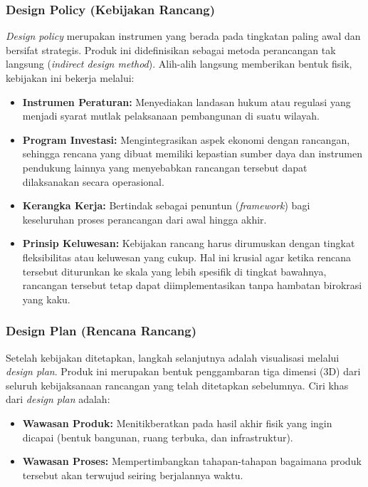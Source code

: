 \documentclass[../rumukota.tex]{subfiles}
\begin{document}
\subsubsection{Design Policy (Kebijakan Rancang)}
\textit{Design policy} merupakan instrumen yang berada pada tingkatan paling awal dan bersifat strategis. Produk ini didefinisikan sebagai metoda perancangan tak langsung (\textit{indirect design method}). Alih-alih langsung memberikan bentuk fisik, kebijakan ini bekerja melalui:
\begin{itemize}
	\item \textbf{Instrumen Peraturan:} Menyediakan landasan hukum atau regulasi yang menjadi syarat mutlak pelaksanaan pembangunan di suatu wilayah.
	\item \textbf{Program Investasi:} Mengintegrasikan aspek ekonomi dengan rancangan, sehingga rencana yang dibuat memiliki kepastian sumber daya dan instrumen pendukung lainnya yang menyebabkan rancangan tersebut dapat dilaksanakan secara operasional.
	\item \textbf{Kerangka Kerja:} Bertindak sebagai penuntun (\textit{framework}) bagi keseluruhan proses perancangan dari awal hingga akhir.
	\item \textbf{Prinsip Keluwesan:} Kebijakan rancang harus dirumuskan dengan tingkat fleksibilitas atau keluwesan yang cukup. Hal ini krusial agar ketika rencana tersebut diturunkan ke skala yang lebih spesifik di tingkat bawahnya, rancangan tersebut tetap dapat diimplementasikan tanpa hambatan birokrasi yang kaku.
\end{itemize}

\subsubsection{Design Plan (Rencana Rancang)}
Setelah kebijakan ditetapkan, langkah selanjutnya adalah visualisasi melalui \textit{design plan}. Produk ini merupakan bentuk penggambaran tiga dimensi (3D) dari seluruh kebijaksanaan rancangan yang telah ditetapkan sebelumnya. Ciri khas dari \textit{design plan} adalah:
\begin{itemize}
	\item \textbf{Wawasan Produk:} Menitikberatkan pada hasil akhir fisik yang ingin dicapai (bentuk bangunan, ruang terbuka, dan infrastruktur).
	\item \textbf{Wawasan Proses:} Mempertimbangkan tahapan-tahapan bagaimana produk tersebut akan terwujud seiring berjalannya waktu.
\end{itemize}
\end{document}
